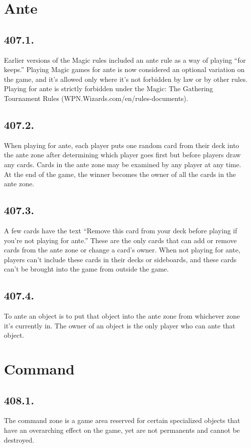 \section{Ante}
\subsection*{407.1.}
Earlier versions of the Magic rules included an ante rule as a way of playing “for keeps.” Playing Magic games for ante is now considered an optional variation on the game, and it’s allowed only where it’s not forbidden by law or by other rules. Playing for ante is strictly forbidden under the Magic: The Gathering Tournament Rules (WPN.Wizards.com/en/rules-documents).

\subsection*{407.2.}
When playing for ante, each player puts one random card from their deck into the ante zone after determining which player goes first but before players draw any cards. Cards in the ante zone may be examined by any player at any time. At the end of the game, the winner becomes the owner of all the cards in the ante zone.

\subsection*{407.3.}
A few cards have the text “Remove this card from your deck before playing if you’re not playing for ante.” These are the only cards that can add or remove cards from the ante zone or change a card’s owner. When not playing for ante, players can’t include these cards in their decks or sideboards, and these cards can’t be brought into the game from outside the game.

\subsection*{407.4.}
To ante an object is to put that object into the ante zone from whichever zone it’s currently in. The owner of an object is the only player who can ante that object.

\section{Command}
\subsection*{408.1.}
The command zone is a game area reserved for certain specialized objects that have an overarching effect on the game, yet are not permanents and cannot be destroyed.

